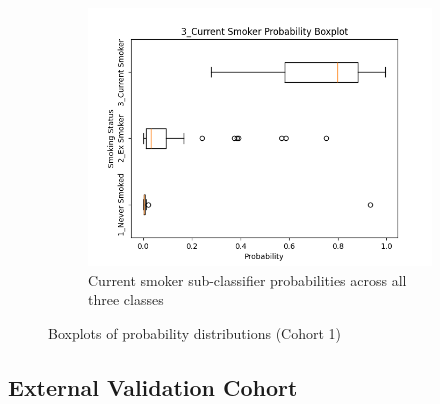 \documentclass{article}
\begin{document}
\begin{figure}
    \begin{subfigure}{0.48\textwidth}
        \centering
        \includegraphics[width=\linewidth]{cohort1_3_boxplot.png}
        \caption{Current smoker sub-classifier probabilities across all three classes}
    \end{subfigure}
    \caption{Boxplots of probability distributions (Cohort 1)}
\end{figure}

\subsection{External Validation Cohort} \label{sec:val-cohort}
\end{document}
